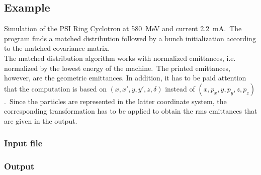 \subsection{Example}
Simulation of the PSI Ring Cyclotron at \SI{580}{\mega\electronvolt} and current \SI{2.2}{\milli\ampere}.\ The program finds a matched
distribution followed by a bunch initialization according to the matched covariance matrix.\\
The matched distribution algorithm works with normalized emittances, i.e. normalized by the lowest energy of the
machine.\ The printed emittances, however, are the geometric emittances. In addition, it has to
be paid attention that the computation is based on $(x,x',y,y',z,\delta)$ instead of $(x,p_{x},y,p_{y},z,p_{z})$.\ Since
the particles are represented in the latter coordinate system, the corresponding transformation has to be applied to
obtain the rms emittances that are given in the output.
\subsubsection{Input file}
\subsubsection{Output}

